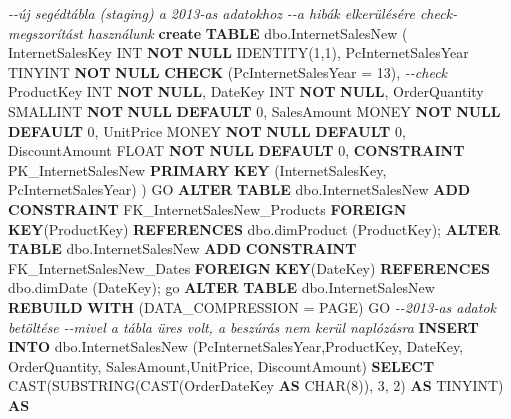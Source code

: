 \documentclass[
  magyar,
]{article}
\newenvironment{Shaded}{}{}
\newcommand{\CommentTok}[1]{\textcolor[rgb]{0.38,0.63,0.69}{\textit{#1}}}
\newcommand{\DataTypeTok}[1]{\textcolor[rgb]{0.56,0.13,0.00}{#1}}
\newcommand{\DecValTok}[1]{\textcolor[rgb]{0.25,0.63,0.44}{#1}}
\newcommand{\FunctionTok}[1]{\textcolor[rgb]{0.02,0.16,0.49}{#1}}
\newcommand{\KeywordTok}[1]{\textcolor[rgb]{0.00,0.44,0.13}{\textbf{#1}}}
\newcommand{\NormalTok}[1]{#1}
\newcommand{\OperatorTok}[1]{\textcolor[rgb]{0.40,0.40,0.40}{#1}}
\begin{document}
\begin{Shaded}
\begin{Highlighting}[]
\CommentTok{{-}{-}új segédtábla (staging) a 2013{-}as adatokhoz}
\CommentTok{{-}{-}a hibák elkerülésére check{-}megszorítást használunk}
\KeywordTok{create} \KeywordTok{TABLE}\NormalTok{ dbo.InternetSalesNew (}
\NormalTok{   InternetSalesKey }\DataTypeTok{INT} \KeywordTok{NOT} \KeywordTok{NULL}\NormalTok{ IDENTITY(}\DecValTok{1}\NormalTok{,}\DecValTok{1}\NormalTok{),}
\NormalTok{   PcInternetSalesYear TINYINT }\KeywordTok{NOT} \KeywordTok{NULL} \KeywordTok{CHECK}\NormalTok{ (PcInternetSalesYear }\OperatorTok{=} \DecValTok{13}\NormalTok{), }\CommentTok{{-}{-}check}
\NormalTok{   ProductKey }\DataTypeTok{INT} \KeywordTok{NOT} \KeywordTok{NULL}\NormalTok{,}
\NormalTok{   DateKey }\DataTypeTok{INT} \KeywordTok{NOT} \KeywordTok{NULL}\NormalTok{,}
\NormalTok{   OrderQuantity }\DataTypeTok{SMALLINT} \KeywordTok{NOT} \KeywordTok{NULL} \KeywordTok{DEFAULT} \DecValTok{0}\NormalTok{,}
\NormalTok{   SalesAmount MONEY }\KeywordTok{NOT} \KeywordTok{NULL} \KeywordTok{DEFAULT} \DecValTok{0}\NormalTok{,}
\NormalTok{   UnitPrice MONEY }\KeywordTok{NOT} \KeywordTok{NULL} \KeywordTok{DEFAULT} \DecValTok{0}\NormalTok{,}
\NormalTok{   DiscountAmount }\DataTypeTok{FLOAT} \KeywordTok{NOT} \KeywordTok{NULL} \KeywordTok{DEFAULT} \DecValTok{0}\NormalTok{,}
   \KeywordTok{CONSTRAINT}\NormalTok{ PK\_InternetSalesNew }\KeywordTok{PRIMARY} \KeywordTok{KEY}\NormalTok{ (InternetSalesKey,}
\NormalTok{PcInternetSalesYear)}
\NormalTok{)}
\NormalTok{GO}
\KeywordTok{ALTER} \KeywordTok{TABLE}\NormalTok{ dbo.InternetSalesNew }\KeywordTok{ADD} \KeywordTok{CONSTRAINT}\NormalTok{ FK\_InternetSalesNew\_Products }\KeywordTok{FOREIGN}
\KeywordTok{KEY}\NormalTok{(ProductKey) }\KeywordTok{REFERENCES}\NormalTok{ dbo.dimProduct (ProductKey);}
\KeywordTok{ALTER} \KeywordTok{TABLE}\NormalTok{ dbo.InternetSalesNew }\KeywordTok{ADD} \KeywordTok{CONSTRAINT}\NormalTok{ FK\_InternetSalesNew\_Dates }\KeywordTok{FOREIGN}
\KeywordTok{KEY}\NormalTok{(DateKey) }\KeywordTok{REFERENCES}\NormalTok{ dbo.dimDate (DateKey);}
\NormalTok{go}
\KeywordTok{ALTER} \KeywordTok{TABLE}\NormalTok{ dbo.InternetSalesNew }\KeywordTok{REBUILD} \KeywordTok{WITH}\NormalTok{ (DATA\_COMPRESSION }\OperatorTok{=}\NormalTok{ PAGE)}
\NormalTok{GO}
\CommentTok{{-}{-}2013{-}as adatok betöltése}
\CommentTok{{-}{-}mivel a tábla üres volt, a beszúrás nem kerül naplózásra}
\KeywordTok{INSERT} \KeywordTok{INTO}\NormalTok{ dbo.InternetSalesNew (PcInternetSalesYear,ProductKey, DateKey,}
\NormalTok{   OrderQuantity, SalesAmount,UnitPrice, DiscountAmount)}
\KeywordTok{SELECT} \FunctionTok{CAST}\NormalTok{(SUBSTRING(}\FunctionTok{CAST}\NormalTok{(OrderDateKey }\KeywordTok{AS} \DataTypeTok{CHAR}\NormalTok{(}\DecValTok{8}\NormalTok{)), }\DecValTok{3}\NormalTok{, }\DecValTok{2}\NormalTok{) }\KeywordTok{AS}\NormalTok{ TINYINT) }\KeywordTok{AS}

\end{Highlighting}
\end{Shaded}
\end{document}
